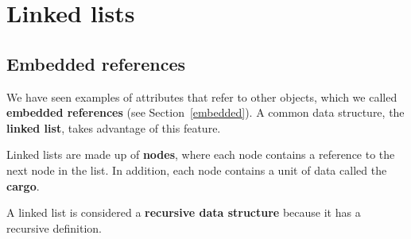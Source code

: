 





\chapter{Linked lists}
\label{list}

\section{Embedded references}

We have seen examples of attributes that refer to other objects, which
we called {\bf embedded references} (see Section~\ref{embedded}).  A
common data structure, the {\bf linked list}, takes advantage of this
feature.

Linked lists are made up of {\bf nodes}, where each node contains a
reference to the next node in the list.  In addition, each node
contains a unit of data called the {\bf cargo}.

A linked list is considered a {\bf recursive data
structure} because it has a recursive definition.


